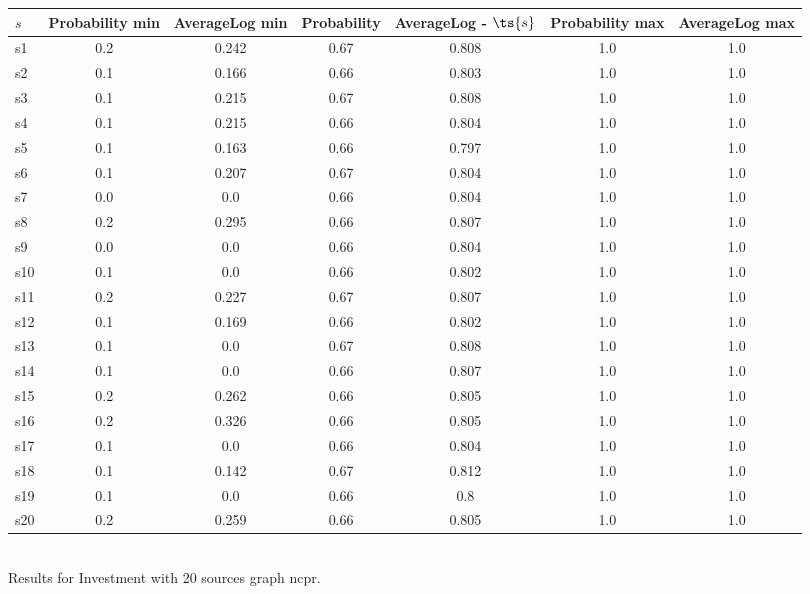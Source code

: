 \documentclass{article}
\begin{document}
\noindent\begin{tabular}{|l|c|c|c|c|c|c|}
\hline
$s$& Probability min & AverageLog min & Probability & AverageLog - $\ts{s}$ & Probability max & AverageLog max\\
\hline
s1 &0.2 & 0.242 & 0.67 & 0.808 & 1.0 & 1.0\\
\hline
s2 &0.1 & 0.166 & 0.66 & 0.803 & 1.0 & 1.0\\
\hline
s3 &0.1 & 0.215 & 0.67 & 0.808 & 1.0 & 1.0\\
\hline
s4 &0.1 & 0.215 & 0.66 & 0.804 & 1.0 & 1.0\\
\hline
s5 &0.1 & 0.163 & 0.66 & 0.797 & 1.0 & 1.0\\
\hline
s6 &0.1 & 0.207 & 0.67 & 0.804 & 1.0 & 1.0\\
\hline
s7 &0.0 & 0.0 & 0.66 & 0.804 & 1.0 & 1.0\\
\hline
s8 &0.2 & 0.295 & 0.66 & 0.807 & 1.0 & 1.0\\
\hline
s9 &0.0 & 0.0 & 0.66 & 0.804 & 1.0 & 1.0\\
\hline
s10 &0.1 & 0.0 & 0.66 & 0.802 & 1.0 & 1.0\\
\hline
s11 &0.2 & 0.227 & 0.67 & 0.807 & 1.0 & 1.0\\
\hline
s12 &0.1 & 0.169 & 0.66 & 0.802 & 1.0 & 1.0\\
\hline
s13 &0.1 & 0.0 & 0.67 & 0.808 & 1.0 & 1.0\\
\hline
s14 &0.1 & 0.0 & 0.66 & 0.807 & 1.0 & 1.0\\
\hline
s15 &0.2 & 0.262 & 0.66 & 0.805 & 1.0 & 1.0\\
\hline
s16 &0.2 & 0.326 & 0.66 & 0.805 & 1.0 & 1.0\\
\hline
s17 &0.1 & 0.0 & 0.66 & 0.804 & 1.0 & 1.0\\
\hline
s18 &0.1 & 0.142 & 0.67 & 0.812 & 1.0 & 1.0\\
\hline
s19 &0.1 & 0.0 & 0.66 & 0.8 & 1.0 & 1.0\\
\hline
s20 &0.2 & 0.259 & 0.66 & 0.805 & 1.0 & 1.0\\
\hline
\end{tabular}\\

\noindent Results for Investment with 20 sources graph ncpr.
\end{document}
